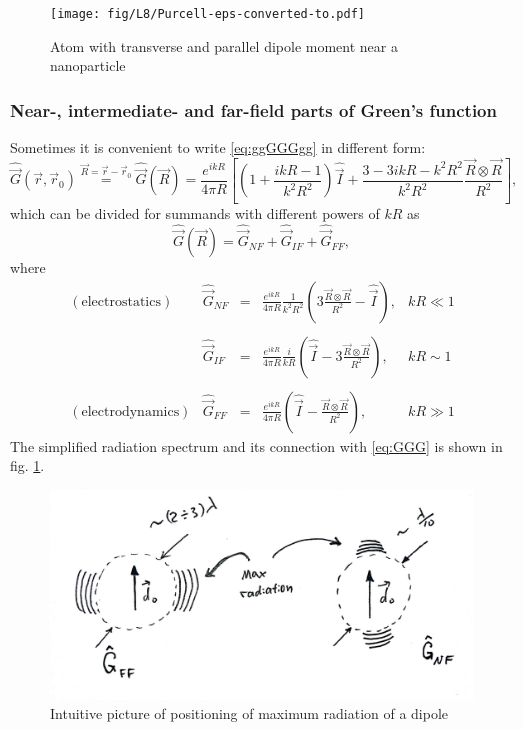 \begin{figure}
	\begin{center}
		\texttt{[image: fig/L8/Purcell-eps-converted-to.pdf]}
		\caption{Atom with transverse and parallel dipole moment near a nanoparticle}
	\end{center}
\end{figure}

\subsubsection{Near-, intermediate- and far-field parts of Green's function}

Sometimes it is convenient to write  \eqref{eq:ggGGGgg} in different form:
\begin{equation}
	\hat{\vec{G}} (\vec{r}, \vec{r}_0) \overset{\vec{R} = \vec{r} - \vec{r}_0}{=} \hat{\vec{G}}(\vec{R}) = \frac{e^{ikR}}{4\pi R} \left[  \left( 1 + \frac{ikR - 1}{k^2R^2} \right) \hat{\vec{I}} + \frac{3 - 3ikR - k^2R^2}{k^2R^2} \frac{\vec{R}\otimes\vec{R}}{R^2} \right],
\end{equation}
which can be divided for summands with different powers of $kR$ as
\begin{equation}
	\hat{\vec{G}}(\vec{R}) = \hat{\vec{G}}_{NF} + \hat{\vec{G}}_{IF} + \hat{\vec{G}}_{FF},
	\label{eq:GGG}
\end{equation}
where
\begin{equation*}
	\begin{matrix}
		(\text{electrostatics}) & \hat{\vec{G}}_{NF} &=& \frac{e^{ikR}}{4\pi R} \frac{1}{k^2R^2} \left( 3 \frac{\vec{R}\otimes\vec{R}}{R^2} - \hat{\vec{I}} \right), & kR \ll 1 \\ \\
		& \hat{\vec{G}}_{IF} &=& \frac{e^{ikR}}{4\pi R} \frac{i}{kR}  \left( \hat{\vec{I}} - 3\frac{\vec{R}\otimes\vec{R}}{R^2} \right), & kR \sim 1 \\ \\
		(\text{electrodynamics})& \hat{\vec{G}}_{FF} &=& \frac{e^{ikR}}{4\pi R}  \left( \hat{\vec{I}} - \frac{\vec{R}\otimes\vec{R}}{R^2} \right), & kR \gg 1
	\end{matrix}
\end{equation*}
The simplified radiation spectrum and its connection with \eqref{eq:GGG} is shown in fig. \ref{fig:radiation1}.

\begin{figure}
	\centering
	\includegraphics[width=0.6\linewidth]{fig/L8/radiation_1}
	\caption{Intuitive picture of positioning of maximum radiation of a dipole}
	\label{fig:radiation1}
\end{figure}


